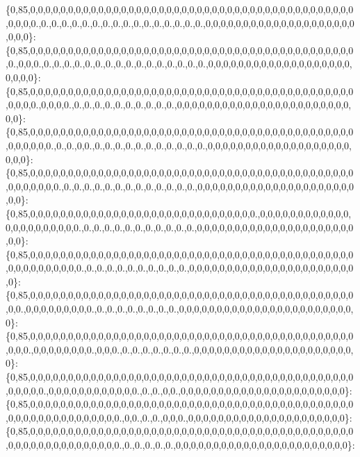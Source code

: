 \{0,85,0,0,0,0,0,0,0,0,0,0,0,0,0,0,0,0,0,0,0,0,0,0,0,0,0,0,0,0,0,0,0,0,0,0,0,0,0,0,0,0,0,0,0,0,0,0,0.,0.,0.,0.,0.,0.,0.,0.,0.,0.,0.,0.,0.,0.,0.,0.,0.,0,0,0,0,0,0,0,0,0,0,0,0,0,0,0,0,0,0,0,0,0,0,0\}\+: \{0,85,0,0,0,0,0,0,0,0,0,0,0,0,0,0,0,0,0,0,0,0,0,0,0,0,0,0,0,0,0,0,0,0,0,0,0,0,0,0,0,0,0,0,0,0.,0,0,0.,0.,0.,0.,0.,0.,0.,0.,0.,0.,0.,0.,0.,0.,0.,0.,0.,0,0,0,0,0,0,0,0,0,0,0,0,0,0,0,0,0,0,0,0,0,0,0\}\+: \{0,85,0,0,0,0,0,0,0,0,0,0,0,0,0,0,0,0,0,0,0,0,0,0,0,0,0,0,0,0,0,0,0,0,0,0,0,0,0,0,0,0,0,0,0,0,0,0,0.,0,0,0,0.,0.,0.,0.,0.,0.,0.,0.,0.,0.,0.,0,0,0,0,0,0,0,0,0,0,0,0,0,0,0,0,0,0,0,0,0,0,0,0,0\}\+: \{0,85,0,0,0,0,0,0,0,0,0,0,0,0,0,0,0,0,0,0,0,0,0,0,0,0,0,0,0,0,0,0,0,0,0,0,0,0,0,0,0,0,0,0,0,0,0,0,0,0,0.,0.,0.,0,0.,0.,0.,0.,0.,0.,0.,0.,0.,0.,0.,0.,0,0,0,0,0,0,0,0,0,0,0,0,0,0,0,0,0,0,0,0,0,0\}\+: \{0,85,0,0,0,0,0,0,0,0,0,0,0,0,0,0,0,0,0,0,0,0,0,0,0,0,0,0,0,0,0,0,0,0,0,0,0,0,0,0,0,0,0,0,0,0,0,0,0,0,0,0.,0.,0.,0.,0.,0.,0.,0.,0.,0.,0.,0.,0.,0.,0,0,0,0,0,0,0,0,0,0,0,0,0,0,0,0,0,0,0,0,0,0,0\}\+: \{0,85,0,0,0,0,0,0,0,0,0,0,0,0,0,0,0,0,0,0,0,0,0,0,0,0,0,0,0,0,0,0.,0,0,0,0,0,0,0,0,0,0,0,0,0,0,0,0,0,0,0,0,0,0.,0.,0.,0.,0.,0.,0.,0.,0.,0.,0.,0.,0,0,0,0,0,0,0,0,0,0,0,0,0,0,0,0,0,0,0,0,0,0,0\}\+: \{0,85,0,0,0,0,0,0,0,0,0,0,0,0,0,0,0,0,0,0,0,0,0,0,0,0,0,0,0,0,0,0,0,0,0,0,0,0,0,0,0,0,0,0,0,0,0,0,0,0,0,0,0,0,0.,0.,0.,0.,0.,0.,0.,0.,0.,0.,0.,0,0,0,0,0,0,0,0,0,0,0,0,0,0,0,0,0,0,0,0,0,0,0\}\+: \{0,85,0,0,0,0,0,0,0,0,0,0,0,0,0,0,0,0,0,0,0,0,0,0,0,0,0,0,0,0,0,0,0,0,0,0,0,0,0,0,0,0,0,0,0,0,0.,0,0,0,0,0,0,0,0,0.,0.,0.,0.,0.,0.,0.,0.,0.,0,0,0,0,0,0,0,0,0,0,0,0,0,0,0,0,0,0,0,0,0,0,0,0\}\+: \{0,85,0,0,0,0,0,0,0,0,0,0,0,0,0,0,0,0,0,0,0,0,0,0,0,0,0,0,0,0,0,0,0,0,0,0,0,0,0,0,0,0,0,0,0,0,0,0.,0,0,0,0,0,0,0,0.,0,0,0.,0.,0.,0.,0.,0.,0.,0.,0,0,0,0,0,0,0,0,0,0,0,0,0,0,0,0,0,0,0,0,0,0\}\+: \{0,85,0,0,0,0,0,0,0,0,0,0,0,0,0,0,0,0,0,0,0,0,0,0,0,0,0,0,0,0,0,0,0,0,0,0,0,0,0,0,0,0,0,0,0,0,0,0,0,0.,0,0,0,0,0,0,0,0,0,0,0,0.,0.,0.,0,0.,0,0,0,0,0,0,0,0,0,0,0,0,0,0,0,0,0,0,0,0,0,0\}\+: \{0,85,0,0,0,0,0,0,0,0,0,0,0,0,0,0,0,0,0,0,0,0,0,0,0,0,0,0,0,0,0,0,0,0,0,0,0,0,0,0,0,0,0,0,0,0,0,0,0,0,0,0,0,0,0,0,0,0,0,0.,0,0.,0.,0.,0,0,0.,0,0,0,0,0,0,0,0,0,0,0,0,0,0,0,0,0,0,0,0,0\}\+: \{0,85,0,0,0,0,0,0,0,0,0,0,0,0,0,0,0,0,0,0,0,0,0,0,0,0,0,0,0,0,0,0,0,0,0,0,0,0,0,0,0,0,0,0,0,0,0,0,0,0,0,0,0,0,0,0,0,0,0,0.,0.,0.,0.,0.,0.,0,0,0,0,0,0,0,0,0,0,0,0,0,0,0,0,0,0,0,0,0,0,0\}\+: 